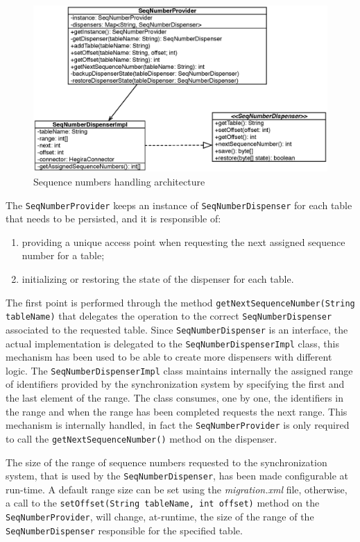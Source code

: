 \begin{figure}[tbh]
  \centering
  \includegraphics[width=12cm]{images/seq_provider}
  \caption{Sequence numbers handling architecture}
  \label{fig:seq-provider}
\end{figure} 

\noindent The \texttt{SeqNumberProvider} keeps an instance of \texttt{SeqNumberDispenser} for each table that needs to be persisted, and it is responsible of:
\begin{enumerate}
\item providing a unique access point when requesting the next assigned sequence number for a table;
\item initializing or restoring the state of the dispenser for each table.
\end{enumerate}
\noindent The first point is performed through the method \texttt{getNextSequenceNumber(String tableName)} that delegates the operation to the correct \texttt{SeqNumberDispenser} associated to the requested table.
Since \texttt{SeqNumberDispenser} is an interface, the actual implementation is delegated to the \texttt{SeqNumberDispenserImpl} class, this mechanism has been used to be able to create more dispensers with different logic.
\noindent The \texttt{SeqNumberDispenserImpl} class maintains internally the assigned range of identifiers provided by the synchronization system by specifying the first and the last element of the range. The class consumes, one by one, the identifiers in the range and when the range has been completed requests the next range. This mechanism is internally handled, in fact the \texttt{SeqNumberProvider} is only required to call the \texttt{getNextSequenceNumber()} method on the dispenser.

\noindent The size of the range of sequence numbers requested to the synchronization system, that is used by the \texttt{SeqNumberDispenser}, has been made configurable at run-time. A default range size can be set using the \textit{migration.xml} file, otherwise, a call to the \texttt{setOffset(String tableName, int offset)} method on the \texttt{SeqNumberProvider}, will change, at-runtime, the size of the range of the \texttt{SeqNumberDispenser} responsible for the specified table.

